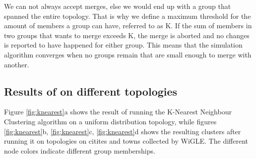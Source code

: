 We can not always accept merges, else we would end up with a group that spanned the entire topology. That is why we define a maximum threshold for the amount of members a group can have, 
referred to as K. If the sum of members in two groups that wants to merge exceeds K, the merge is aborted and no changes is reported to have happened for either group. 
This means that the simulation algorithm converges when no groups remain that are small enough to merge with another.
 
\subsection{Results of on different topologies}
Figure \ref{fig:knearest}a shows the result of running the K-Nearest Neighbour Clustering algorithm on a uniform distribution topology, while figures \ref{fig:knearest}b, \ref{fig:knearest}c, \ref{fig:knearest}d shows the resulting clusters after running it on topologies on citites and towns collected by WiGLE. The different node colors indicate different group memberships.


